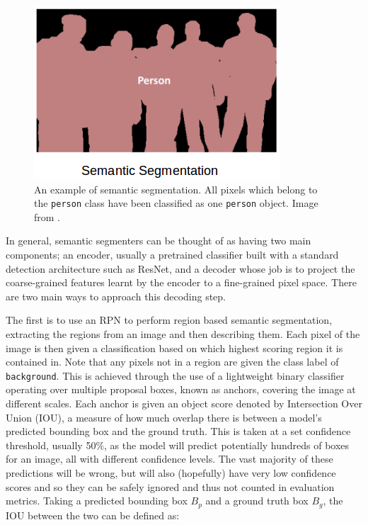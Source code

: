 \begin{figure}
	\begin{center}
		\includegraphics[scale=0.5]{Chapter2/figs/semantic_segmentation.png}
	\end{center}
	\caption[An example of semantic segmentation.]{An example of semantic segmentation. All pixels which belong to the \texttt{person} class have been classified as one \texttt{person} object. Image from \cite{sharma_image_2019}.}
	\label{fig:semantic-eg}
\end{figure}

In general, semantic segmenters can be thought of as having two main components; an encoder, usually a pretrained classifier built with a standard detection architecture such as ResNet, and a decoder whose job is to project the coarse-grained features learnt by the encoder to a fine-grained pixel space. There are two main ways to approach this decoding step.

The first is to use an RPN to perform region based semantic segmentation, extracting the regions from an image and then describing them. Each pixel of the image is then given a classification based on which highest scoring region it is contained in. Note that any pixels not in a region are given the class label of \texttt{background}. This is achieved through the use of a lightweight binary classifier operating over multiple proposal boxes, known as anchors, covering the image at different scales. Each anchor is given an object score denoted by Intersection Over Union (IOU), a measure of how much overlap there is between a model's predicted bounding box and the ground truth. This is taken at a set confidence threshold, usually 50\%, as the model will predict potentially hundreds of boxes for an image, all with different confidence levels. The vast majority of these predictions will be wrong, but will also (hopefully) have very low confidence scores and so they can be safely ignored and thus not counted in evaluation metrics. Taking a predicted bounding box $B_p$ and a ground truth box $B_g$, the IOU between the two can be defined as:

